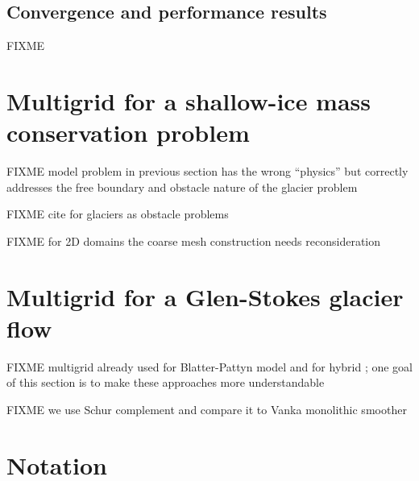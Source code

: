 \documentclass[letterpaper,final,12pt,reqno]{amsart}
\theoremstyle{claim}
\numberwithin{equation}{section}
\numberwithin{figure}{section}
\numberwithin{table}{section}
\begin{document}
\subsection*{Convergence and performance results} FIXME


\section{Multigrid for a shallow-ice mass conservation problem} \label{sec:sia}

FIXME model problem in previous section has the wrong ``physics'' but correctly addresses the free boundary and obstacle nature of the glacier problem

FIXME cite for glaciers as obstacle problems \cite{Bueler2016,Bueler2020,Calvoetal2002,JouvetBueler2012}

FIXME for 2D domains the coarse mesh construction needs reconsideration


\section{Multigrid for a Glen-Stokes glacier flow} \label{sec:stokes}

FIXME multigrid already used for Blatter-Pattyn model \cite{BrownSmithAhmadia2013} and for hybrid \cite{Jouvetetal2013}; one goal of this section is to make these approaches more understandable

FIXME we use Schur complement \cite{Bueler2021,Elmanetal2014} and compare it to Vanka monolithic smoother \cite{Farrelletal2019}

\small

\bigskip



\normalsize

\appendix
\section{Notation}
\end{document}
